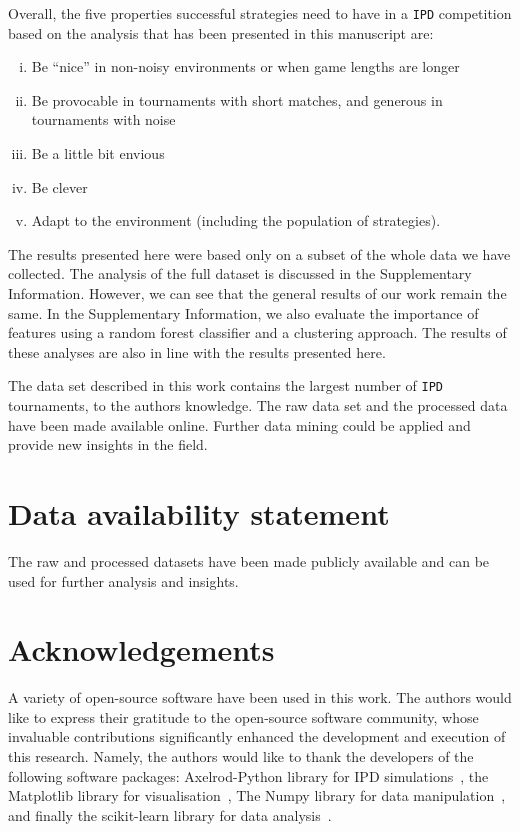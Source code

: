 \documentclass{article}
\def\IPD{\texttt{IPD}}
\begin{document}
Overall, the five properties successful strategies need to have in a \IPD{} competition
based on the analysis that has been presented in this manuscript are:

\begin{enumerate}[(i)]
    \item Be ``nice'' in non-noisy environments or when game lengths are longer
    \item Be provocable in tournaments with short matches, and generous in tournaments with noise
    \item Be a little bit envious
    \item Be clever
    \item Adapt to the environment (including the population of strategies).
\end{enumerate}

The results presented here were based only on a subset of the whole data we have
collected. The analysis of the full dataset is discussed in the Supplementary Information.
However, we can see that the general results of our work remain the same. In the
Supplementary Information, we also evaluate the importance of features using a
random forest classifier and a clustering approach. The results of these
analyses are also in line with the results presented here.

The data set described in this work contains the largest number of \IPD{}
tournaments, to the authors knowledge. The raw data set and the processed data
have been made available online. Further data mining
could be applied and provide new insights in the field.

\section{Data availability statement}

The raw and processed datasets have been made publicly available
and can be used for further analysis and insights.

\section{Acknowledgements}

A variety of open-source software have been used in this work. The authors would
like to express their gratitude to the open-source software community, whose
invaluable contributions significantly enhanced the development and execution of
this research. Namely, the authors would like to thank the developers of the
following software packages: Axelrod-Python library for IPD
simulations~\cite{axelrodproject}, the Matplotlib library for
visualisation~\cite{hunter2007matplotlib}, The Numpy library for data
manipulation~\cite{walt2011numpy}, and finally the scikit-learn library for data
analysis~\cite{scikit-learn}.



\end{document}
